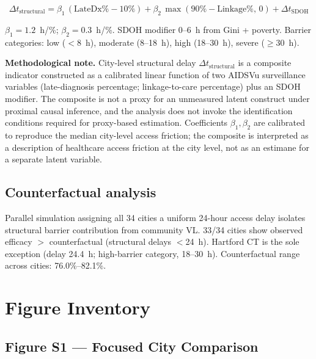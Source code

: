 \documentclass[11pt]{article}
\theoremstyle{definition}
\theoremstyle{remark}
\begin{document}
\begin{equation}
\Delta t_{\text{structural}} = \beta_{1}\,(\text{LateDx}\% - 10\%) + \beta_{2}\,\max(90\% - \text{Linkage}\%,\,0) + \Delta t_{\text{SDOH}}
\label{eq:delay_si}
\end{equation}

$\beta_{1} = 1.2$~h/\%; $\beta_{2} = 0.3$~h/\%. SDOH modifier 0--6~h from Gini + poverty. Barrier categories: low ($<$8~h), moderate (8--18~h), high (18--30~h), severe ($\geq$30~h).

\textbf{Methodological note.} City-level structural delay $\Delta t_{\text{structural}}$ is a composite indicator constructed as a calibrated linear function of two AIDSVu surveillance variables (late-diagnosis percentage; linkage-to-care percentage) plus an SDOH modifier. The composite is not a proxy for an unmeasured latent construct under proximal causal inference\cite{tchetgentchetgen2020_si}, and the analysis does not invoke the identification conditions required for proxy-based estimation\cite{pearl2009_si}. Coefficients $\beta_{1}, \beta_{2}$ are calibrated to reproduce the median city-level access friction; the composite is interpreted as a description of healthcare access friction at the city level, not as an estimane for a separate latent variable.

\subsection{Counterfactual analysis}

Parallel simulation assigning all 34 cities a uniform 24-hour access delay isolates structural barrier contribution from community VL. 33/34 cities show observed efficacy $>$ counterfactual (structural delays $<$24~h). Hartford CT is the sole exception (delay 24.4~h; high-barrier category, 18--30~h). Counterfactual range across cities: 76.0\%--82.1\%.


\section{Figure Inventory}

\subsection{Figure S1 --- Focused City Comparison}
\end{document}
